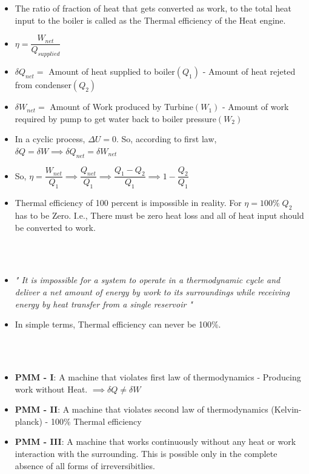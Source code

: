 \documentclass[8pt]{article}
\begin{document}
		\begin{itemize}[wide]
			\item The ratio of fraction of heat that gets converted as work, to the total heat input to the boiler is called as the Thermal efficiency of the Heat engine. 
			\item $\boxed{\eta=\dfrac{W_{net}}{Q_{supplied}}}$	
			\item $\delta Q_{net} =$ Amount of heat supplied to boiler$(Q_1)$ - Amount of heat rejeted from condenser$(Q_2)$
			\item $\delta W_{net} =$ Amount of Work produced by Turbine$(W_1)$ - Amount of work required by pump to get water back to boiler pressure$(W_2)$	
			\item In a cyclic process, $\Delta U = 0$. So, according to first law, $\delta Q = \delta W \implies \delta Q_{net} = \delta W_{net}$
			\item So, $\eta = \dfrac{W_{net}}{Q_1} \implies \dfrac{Q_{net}}{Q_1} \implies \dfrac{Q_1 - Q_2}{Q_1} \implies \boxed{1 - \dfrac{Q_2}{Q_1}}$
			\item Thermal efficiency of 100 percent is impossible in reality.  For $\eta = 100\%\; Q_2$ has to be Zero. I.e., There must be zero heat loss and all of heat input should be converted to work.   
		\end{itemize}
		\hrulefill\\
\\
			\begin{itemize}[wide]
				\item \textit{" It is impossible for a system to operate in a thermodynamic cycle and deliver a net amount of energy by work to its surroundings while receiving energy by heat transfer from a single reservoir "}
				\item In simple terms, Thermal efficiency can never be 100\%.
			\end{itemize}
		\hrulefill\\
\\
			\begin{itemize}
				\item \textbf{PMM - I}: A machine that violates first law of thermodynamics - Producing work without Heat. $\implies \delta Q \neq \delta W$
				\item \textbf{PMM - II}: A machine that violates second law of thermodynamics (Kelvin-planck) - 100\% Thermal efficiency
				\item \textbf{PMM - III}: A machine that works continuously without any heat or work interaction with the surrounding. This is possible only in the complete absence of all forms of irreversibitlies. 
			\end{itemize}
\end{document}
